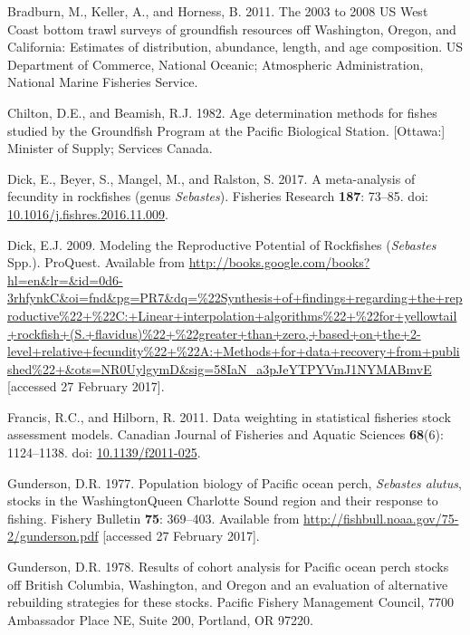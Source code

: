 \documentclass[12pt,]{article}
\begin{document}
\renewcommand{\thepage}{}

\hypertarget{refs}{}
\hypertarget{ref-bradburn_2003_2011}{}
Bradburn, M., Keller, A., and Horness, B. 2011. The 2003 to 2008 US West
Coast bottom trawl surveys of groundfish resources off Washington,
Oregon, and California: Estimates of distribution, abundance, length,
and age composition. US Department of Commerce, National Oceanic;
Atmospheric Administration, National Marine Fisheries Service.

\hypertarget{ref-chilton_age_1982}{}
Chilton, D.E., and Beamish, R.J. 1982. Age determination methods for
fishes studied by the Groundfish Program at the Pacific Biological
Station. {[}Ottawa:{]} Minister of Supply; Services Canada.

\hypertarget{ref-dick_meta-analysis_2017}{}
Dick, E., Beyer, S., Mangel, M., and Ralston, S. 2017. A meta-analysis
of fecundity in rockfishes (genus \emph{Sebastes}). Fisheries Research
\textbf{187}: 73--85. doi:
\href{https://doi.org/10.1016/j.fishres.2016.11.009}{10.1016/j.fishres.2016.11.009}.

\hypertarget{ref-dick_modeling_2009}{}
Dick, E.J. 2009. Modeling the Reproductive Potential of Rockfishes
(\emph{Sebastes} Spp.). ProQuest. Available from
\url{http://books.google.com/books?hl=en\&lr=\&id=0d6-3rhfynkC\&oi=fnd\&pg=PR7\&dq=\%22Synthesis+of+findings+regarding+the+reproductive\%22+\%22C:+Linear+interpolation+algorithms\%22+\%22for+yellowtail+rockfish+(S.+flavidus)\%22+\%22greater+than+zero,+based+on+the+2-level+relative+fecundity\%22+\%22A:+Methods+for+data+recovery+from+published\%22+\&ots=NR0UylgymD\&sig=58IaN_a3pJeYTPYVmJ1NYMABmvE}
{[}accessed 27 February 2017{]}.

\hypertarget{ref-francis_data_2011}{}
Francis, R.C., and Hilborn, R. 2011. Data weighting in statistical
fisheries stock assessment models. Canadian Journal of Fisheries and
Aquatic Sciences \textbf{68}(6): 1124--1138. doi:
\href{https://doi.org/10.1139/f2011-025}{10.1139/f2011-025}.

\hypertarget{ref-gunderson_population_1977}{}
Gunderson, D.R. 1977. Population biology of Pacific ocean perch,
\emph{Sebastes alutus}, stocks in the WashingtonQueen Charlotte Sound
region and their response to fishing. Fishery Bulletin \textbf{75}:
369--403. Available from
\url{http://fishbull.noaa.gov/75-2/gunderson.pdf} {[}accessed 27
February 2017{]}.

\hypertarget{ref-gunderson_results_1978}{}
Gunderson, D.R. 1978. Results of cohort analysis for Pacific ocean perch
stocks off British Columbia, Washington, and Oregon and an evaluation of
alternative rebuilding strategies for these stocks. Pacific Fishery
Management Council, 7700 Ambassador Place NE, Suite 200, Portland, OR
97220.
\end{document}

